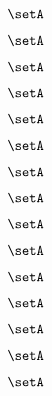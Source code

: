 {\begin{forslides}
    \begin{equation}
        \label{eq:feedback-175}
        \setA
    \end{equation}

    \begin{equation}
        \label{eq:feedback-176}
        \setA
    \end{equation}

    \begin{equation}
        \label{eq:feedback-177}
        \setA
    \end{equation}

    \begin{equation}
        \label{eq:feedback-178}
        \setA
    \end{equation}

    \begin{equation}
        \label{eq:feedback-179}
        \setA
    \end{equation}

    \begin{equation}
        \label{eq:feedback-180}
        \setA
    \end{equation}

    \begin{equation}
        \label{eq:feedback-181}
        \setA
    \end{equation}

    \begin{equation}
        \label{eq:feedback-182}
        \setA
    \end{equation}

    \begin{equation}
        \label{eq:feedback-183}
        \setA
    \end{equation}

    \begin{equation}
        \label{eq:feedback-184}
        \setA
    \end{equation}

    \begin{equation}
        \label{eq:feedback-185}
        \setA
    \end{equation}

    \begin{equation}
        \label{eq:feedback-186}
        \setA
    \end{equation}

    \begin{equation}
        \label{eq:feedback-187}
        \setA
    \end{equation}

    \begin{equation}
        \label{eq:feedback-188}
        \setA
    \end{equation}

    \begin{equation}
        \label{eq:feedback-189}
        \setA
    \end{equation}

\end{forslides}

}
